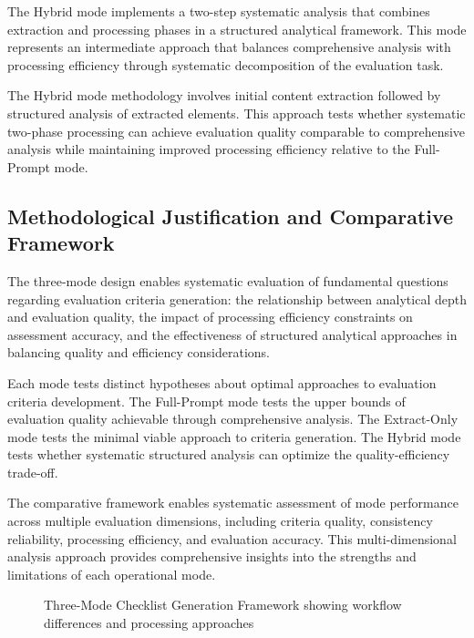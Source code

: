 The Hybrid mode implements a two-step systematic analysis that combines extraction and processing phases in a structured analytical framework. This mode represents an intermediate approach that balances comprehensive analysis with processing efficiency through systematic decomposition of the evaluation task.

The Hybrid mode methodology involves initial content extraction followed by structured analysis of extracted elements. This approach tests whether systematic two-phase processing can achieve evaluation quality comparable to comprehensive analysis while maintaining improved processing efficiency relative to the Full-Prompt mode.

\subsection{Methodological Justification and Comparative Framework}

The three-mode design enables systematic evaluation of fundamental questions regarding evaluation criteria generation: the relationship between analytical depth and evaluation quality, the impact of processing efficiency constraints on assessment accuracy, and the effectiveness of structured analytical approaches in balancing quality and efficiency considerations.

Each mode tests distinct hypotheses about optimal approaches to evaluation criteria development. The Full-Prompt mode tests the upper bounds of evaluation quality achievable through comprehensive analysis. The Extract-Only mode tests the minimal viable approach to criteria generation. The Hybrid mode tests whether systematic structured analysis can optimize the quality-efficiency trade-off.

The comparative framework enables systematic assessment of mode performance across multiple evaluation dimensions, including criteria quality, consistency reliability, processing efficiency, and evaluation accuracy. This multi-dimensional analysis approach provides comprehensive insights into the strengths and limitations of each operational mode.

\begin{figure}[htbp]
    \centering
    \caption{Three-Mode Checklist Generation Framework showing workflow differences and processing approaches}
    \label{fig:three-mode-framework}
\end{figure}

